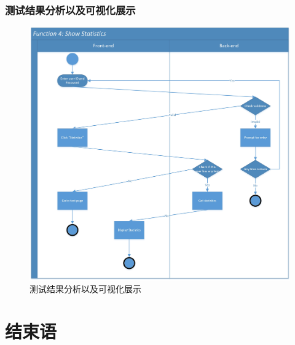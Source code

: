 \documentclass[twoside,11pt]{article}
\begin{document}
\subsubsection{测试结果分析以及可视化展示}
\begin{figure}[H]
    \centering
    \includegraphics[width=1\columnwidth]{SwimLaneDiagram/Usecase_4.jpg}
    \caption{测试结果分析以及可视化展示}
    \label{fig:statistics}
\end{figure}
\newpage

\section{结束语}
\end{document}
